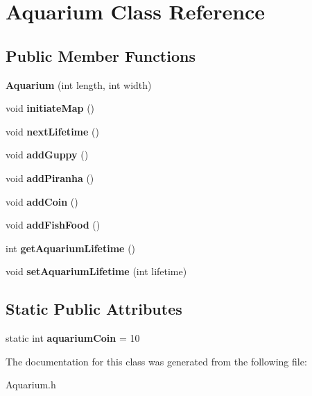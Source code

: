 \hypertarget{class_aquarium}{}\section{Aquarium Class Reference}
\label{class_aquarium}
\subsection*{Public Member Functions}
\begin{DoxyCompactItemize}
\item 
\mbox{\label{class_aquarium_afc3769b98e225080f88cc3506967630b}} 
{\bfseries Aquarium} (int length, int width)
\item 
\mbox{\label{class_aquarium_a5545a351928f1669894a4e3ce8c991c7}} 
void {\bfseries initiate\+Map} ()
\item 
\mbox{\label{class_aquarium_a6697d309ab83f5f29942c78abae302f9}} 
void {\bfseries next\+Lifetime} ()
\item 
\mbox{\label{class_aquarium_a8e6a73c98176e993a633d1da303ee0a9}} 
void {\bfseries add\+Guppy} ()
\item 
\mbox{\label{class_aquarium_a78cf0346acc80cb65c09c3e71b853921}} 
void {\bfseries add\+Piranha} ()
\item 
\mbox{\label{class_aquarium_a9e14c2ba9addcf10c5cc68ff910ac387}} 
void {\bfseries add\+Coin} ()
\item 
\mbox{\label{class_aquarium_a2182e36f0ee4440eeb7837e9ccb32eae}} 
void {\bfseries add\+Fish\+Food} ()
\item 
\mbox{\label{class_aquarium_a2c17ac30fcdf6fd392df069a347461c4}} 
int {\bfseries get\+Aquarium\+Lifetime} ()
\item 
\mbox{\label{class_aquarium_a6e6dbecee1ec13aaf052ac51ea611f88}} 
void {\bfseries set\+Aquarium\+Lifetime} (int lifetime)
\end{DoxyCompactItemize}
\subsection*{Static Public Attributes}
\begin{DoxyCompactItemize}
\item 
\mbox{\label{class_aquarium_ab1b494ef184b67398018b7727244dab7}} 
static int {\bfseries aquarium\+Coin} = 10
\end{DoxyCompactItemize}


The documentation for this class was generated from the following file\+:\begin{DoxyCompactItemize}
\item 
Aquarium.\+h\end{DoxyCompactItemize}
